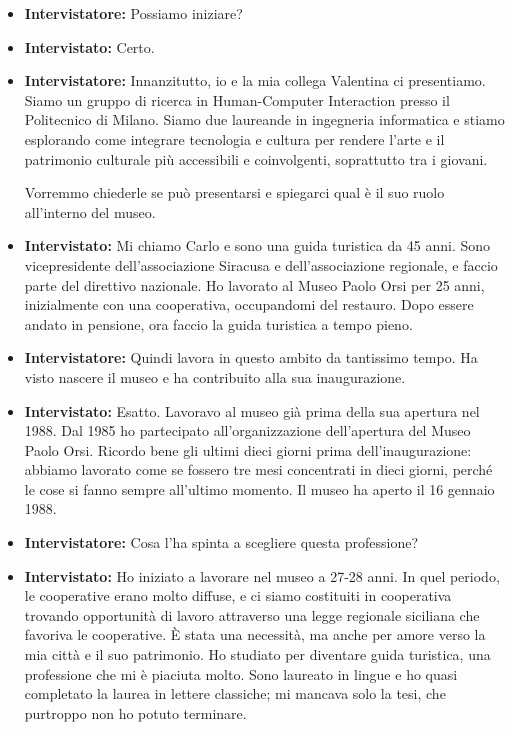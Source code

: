 \documentclass{article}
\begin{document}
\begin{itemize}
    \item \textbf{Intervistatore:} Possiamo iniziare?
    \item \textbf{Intervistato:} Certo.
    \item \textbf{Intervistatore:} Innanzitutto, io e la mia collega Valentina ci presentiamo. Siamo un gruppo di ricerca in Human-Computer Interaction presso il Politecnico di Milano. Siamo due laureande in ingegneria informatica e stiamo esplorando come integrare tecnologia e cultura per rendere l’arte e il patrimonio culturale più accessibili e coinvolgenti, soprattutto tra i giovani.
    
    Vorremmo chiederle se può presentarsi e spiegarci qual è il suo ruolo all’interno del museo.
    
    \item \textbf{Intervistato:} Mi chiamo Carlo e sono una guida turistica da 45 anni. Sono vicepresidente dell’associazione Siracusa e dell’associazione regionale, e faccio parte del direttivo nazionale. Ho lavorato al Museo Paolo Orsi per 25 anni, inizialmente con una cooperativa, occupandomi del restauro. Dopo essere andato in pensione, ora faccio la guida turistica a tempo pieno.
    
    \item \textbf{Intervistatore:} Quindi lavora in questo ambito da tantissimo tempo. Ha visto nascere il museo e ha contribuito alla sua inaugurazione.
    
    \item \textbf{Intervistato:} Esatto. Lavoravo al museo già prima della sua apertura nel 1988. Dal 1985 ho partecipato all’organizzazione dell’apertura del Museo Paolo Orsi. Ricordo bene gli ultimi dieci giorni prima dell’inaugurazione: abbiamo lavorato come se fossero tre mesi concentrati in dieci giorni, perché le cose si fanno sempre all’ultimo momento. Il museo ha aperto il 16 gennaio 1988.
    
    \item \textbf{Intervistatore:} Cosa l’ha spinta a scegliere questa professione?
    
    \item \textbf{Intervistato:} Ho iniziato a lavorare nel museo a 27-28 anni. In quel periodo, le cooperative erano molto diffuse, e ci siamo costituiti in cooperativa trovando opportunità di lavoro attraverso una legge regionale siciliana che favoriva le cooperative. È stata una necessità, ma anche per amore verso la mia città e il suo patrimonio. Ho studiato per diventare guida turistica, una professione che mi è piaciuta molto. Sono laureato in lingue e ho quasi completato la laurea in lettere classiche; mi mancava solo la tesi, che purtroppo non ho potuto terminare.
    

\end{itemize}
\end{document}
